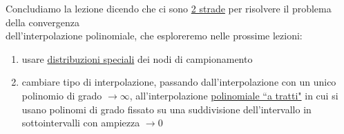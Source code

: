 Concludiamo la lezione dicendo che ci sono \uline{2 strade} per risolvere il problema della convergenza \\ dell'interpolazione polinomiale, che esploreremo nelle prossime lezioni:
\begin{enumerate}
    \item usare \uline{distribuzioni speciali} dei nodi di campionamento
    \item cambiare tipo di interpolazione, passando dall'interpolazione con un unico polinomio di grado $\to \infty$, all'interpolazione \uline{polinomiale ``a tratti"} in cui si usano polinomi di grado fissato su una suddivisione dell'intervallo in sottointervalli con ampiezza $\to 0$
\end{enumerate}
\newpage